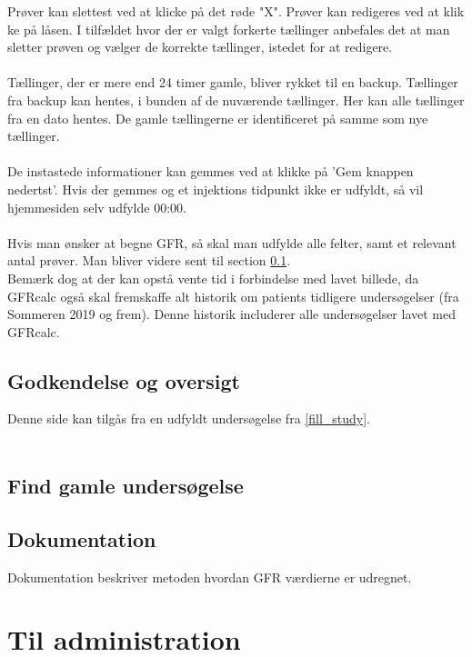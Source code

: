 \documentclass{article}
\begin{document}
Prøver kan slettest ved at klicke på det røde "X". Prøver kan redigeres ved at klik	ke på låsen. I tilfældet hvor der er valgt forkerte tællinger anbefales det at man sletter prøven og vælger de korrekte tællinger, istedet for at redigere.\\\\
Tællinger, der er mere end 24 timer gamle, bliver rykket til en backup. Tællinger fra backup kan hentes, i bunden af de nuværende tællinger. Her kan alle tællinger fra en dato hentes. De gamle tællingerne er identificeret på samme som nye tællinger.
\\\\
De instastede informationer kan gemmes ved at klikke på 'Gem knappen nedertst'. Hvis der gemmes og et injektions tidpunkt ikke er udfyldt, så vil hjemmesiden selv udfylde 00:00.\\\\
Hvis man ønsker at begne GFR, så skal man udfylde alle felter, samt et relevant antal prøver. Man bliver videre sent til section \ref{present_study}.\\
Bemærk dog at der kan opstå vente tid i forbindelse med lavet billede, da GFRcalc også skal fremskaffe alt historik om patients tidligere undersøgelser (fra Sommeren 2019 og frem). Denne historik includerer alle undersøgelser lavet med GFRcalc.  
\subsection{Godkendelse og oversigt}\label{present_study}
Denne side kan tilgås fra en udfyldt undersøgelse fra \ref{fill_study}.\\\\


\subsection{Find gamle undersøgelse}

\subsection{Dokumentation}\label{ref}
Dokumentation beskriver metoden hvordan GFR værdierne er udregnet. 
\newpage
\section{Til administration}
\end{document}
